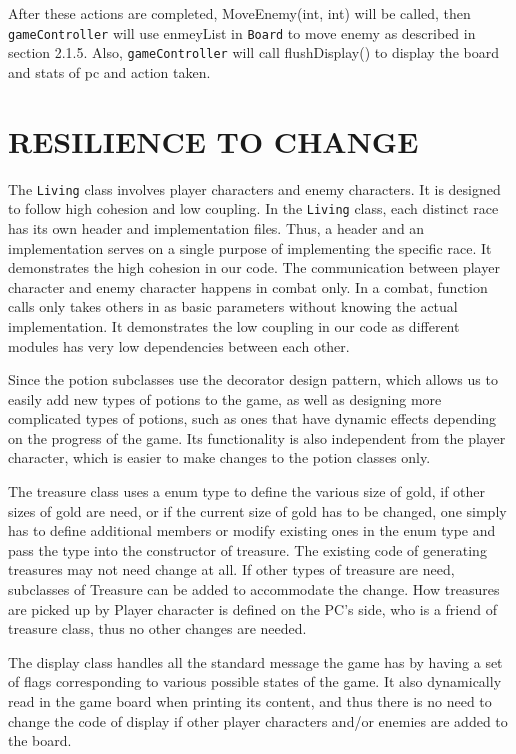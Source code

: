 \documentclass[11pt]{article}
\theoremstyle{plain} \newtheorem{theorem*}{Theorem}[subsection]
\begin{document}
After these actions are completed, \textsf{MoveEnemy(int, int)} will be called, 
then \texttt{gameController} will use \textsf{enmeyList} in \texttt{Board}
to move enemy as described in section 2.1.5. Also, \texttt{gameController}
will call \textsf{flushDisplay()} to display the board and stats of pc and
action taken.\\


\section{RESILIENCE TO CHANGE}

The \texttt{Living} class involves player characters and enemy characters. 
It is designed to follow high cohesion and low coupling. 
In the \texttt{Living} class, each distinct race has its own header and 
implementation files. Thus, a header and an
implementation serves on a single purpose of implementing the specific race. It
demonstrates the high cohesion in our code. The communication between player
character and enemy character happens in combat only. In a combat, function
calls only takes others in as basic parameters without knowing the actual
implementation. It demonstrates the low coupling in our code as different
modules has very low dependencies between each other. 

Since the potion subclasses use the decorator design pattern, which allows us
to easily add new types of potions to the game, as well as designing more
complicated types of potions, such as ones that have dynamic effects depending
on the progress of the game. Its functionality is also independent from the
player character, which is easier to make changes to the potion classes only. 

The treasure class uses a enum type to define the various size of gold, if
other sizes of gold are need, or if the current size of gold has to be changed,
one simply has to define additional members or modify existing ones in the enum
type and pass the type into the constructor of treasure. The existing code of
generating treasures may not need change at all. If other types of treasure are
need, subclasses of Treasure can be added to accommodate the change. How
treasures are picked up by Player character is defined on the PC’s side, who is
a friend of treasure class, thus no other changes are needed. 

The display class handles all the standard message the game has by having a set
of flags corresponding to various possible states of the game. It also
dynamically read in the game board when printing its content, and thus there is
no need to change the code of display if other player characters and/or enemies
are added to the board.  
\end{document}
